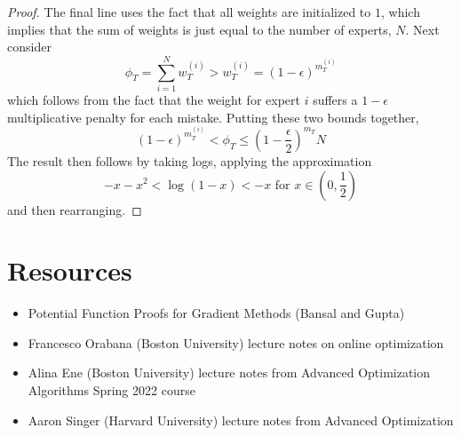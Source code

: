 \documentclass[12pt]{article}
\begin{document}
\begin{proof}
The final line uses the fact that all weights are initialized to $1$, which implies that the sum of weights is
just equal to the number of experts, $N$. Next consider
\[\phi_T = \sum_{i = 1}^{N} w_T^{(i)} > w_T^{(i)} = (1 - \epsilon)^{m_T^{(i)}}\]
which follows from the fact that the weight for expert $i$ suffers a $1 - \epsilon$ multiplicative penalty for each mistake. Putting these two bounds together, 
\[(1 - \epsilon)^{m_T^{(i)}} < \phi_T \leq \left(1 - \frac{\epsilon}{2}\right)^{m_T}N\]
The result then follows by taking logs, applying the approximation 
\[-x - x^2 < \log(1 - x) < -x \text{ for } x \in \left(0, \frac{1}{2}\right)\]
and then rearranging. 
\end{proof}


\section{Resources}
\begin{itemize}
\item Potential Function Proofs for Gradient Methods (Bansal and Gupta) 
\item Francesco Orabana (Boston University) lecture notes on online optimization
\item Alina Ene (Boston University) lecture notes from Advanced Optimization Algorithms Spring 2022 course
\item Aaron Singer (Harvard University) lecture notes from Advanced Optimization
\end{itemize}
\end{document}
